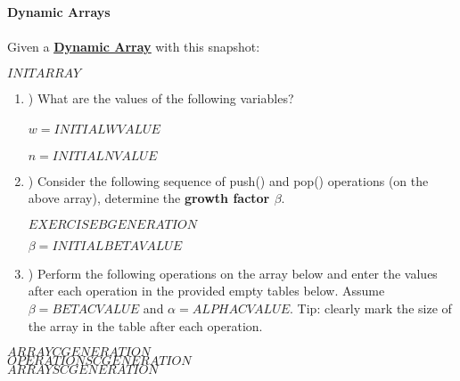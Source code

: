 \textbf{\LARGE{\color{tumgadRed} Dynamic Arrays}}\\
\\
\noindent
Given a \href{https://sebastianoner.github.io/TUMGAD/src/DataStructures/Sequences/Arrays/Arrays}{\textbf{\underline{Dynamic Array}}} with this snapshot:
\begin{center}
    $INITARRAY$
\end{center}
\begin{enumerate}[label=\alph*]
    \item \hspace{-5px}) What are the values of the following variables?\\
    \\
    \color{tumgadRed}
    $w = INITIALWVALUE$\\
    \\
    $n = INITIALNVALUE$
    \\
    \color{black}
    \item \hspace{-5px}) Consider the following sequence of push() and pop() operations (on the above array), determine the \textbf{growth factor $\beta$}.
    \begin{center}
        $EXERCISEBGENERATION$
    \end{center}
    \color{tumgadRed}
    $\beta = INITIALBETAVALUE$\\
    \color{black}
    \item \hspace{-5px}) Perform the following operations on the array below and enter the values after each operation in the provided empty
    tables below. Assume $\beta = BETACVALUE$ and $\alpha = ALPHACVALUE$. Tip: clearly mark the size of the array in the table after each operation.
\end{enumerate}
\begin{center}
    $ARRAYCGENERATION$\\
    \color{tumgadRed}
    $OPERATIONSCGENERATION$\\
    $ARRAYSCGENERATION$
    \color{black}
\end{center}
